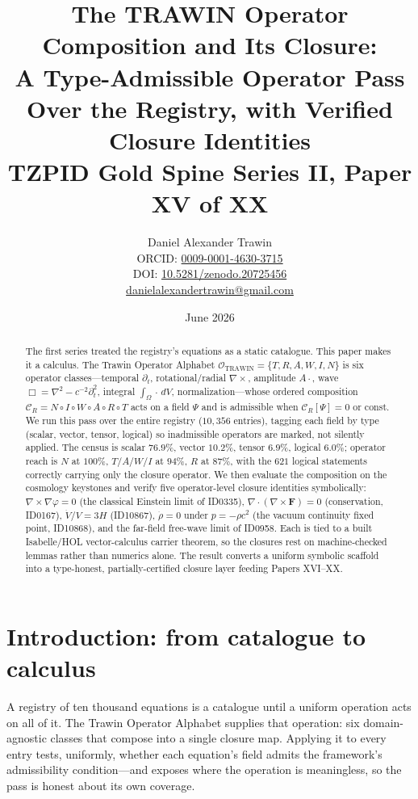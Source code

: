 \documentclass[11pt]{article}
\title{The TRAWIN Operator Composition and Its Closure:\\ A Type-Admissible Operator Pass Over the Registry, with Verified Closure Identities\\[0.6em]
\large TZPID Gold Spine Series II, Paper XV of XX}
\author{Daniel Alexander Trawin\\
\small ORCID: \href{https://orcid.org/0009-0001-4630-3715}{0009-0001-4630-3715}\\
\small DOI: \href{https://doi.org/10.5281/zenodo.20725456}{10.5281/zenodo.20725456}\\
\small \href{mailto:danielalexandertrawin@gmail.com}{danielalexandertrawin@gmail.com}}
\date{June 2026}
\theoremstyle{remark}
\begin{document}
\maketitle
\begin{abstract}
The first series treated the registry's equations as a static catalogue. This paper makes it a calculus. The Trawin Operator Alphabet $\mathcal{O}_{\mathrm{TRAWIN}} = \{T,R,A,W,I,N\}$ is six operator classes---temporal $\partial_t$, rotational/radial $\nabla\times$, amplitude $A\cdot$, wave $\Box = \nabla^2 - c^{-2}\partial_t^2$, integral $\int_\Omega\cdot\,dV$, normalization---whose ordered composition $\mathcal{C}_R = N \circ I \circ W \circ A \circ R \circ T$ acts on a field $\Psi$ and is admissible when $\mathcal{C}_R[\Psi] = 0$ or const. We run this pass over the entire registry ($10{,}356$ entries), tagging each field by type (scalar, vector, tensor, logical) so inadmissible operators are marked, not silently applied. The census is scalar $76.9\%$, vector $10.2\%$, tensor $6.9\%$, logical $6.0\%$; operator reach is $N$ at $100\%$, $T/A/W/I$ at $94\%$, $R$ at $87\%$, with the $621$ logical statements correctly carrying only the closure operator. We then evaluate the composition on the cosmology keystones and verify five operator-level closure identities symbolically: $\nabla\times\nabla\varphi = 0$ (the classical Einstein limit of ID0335), $\nabla\cdot(\nabla\times\mathbf{F}) = 0$ (conservation, ID0167), $\dot V/V = 3H$ (ID10867), $\dot\rho = 0$ under $p = -\rho c^2$ (the vacuum continuity fixed point, ID10868), and the far-field free-wave limit of ID0958. Each is tied to a built Isabelle/HOL vector-calculus carrier theorem, so the closures rest on machine-checked lemmas rather than numerics alone. The result converts a uniform symbolic scaffold into a type-honest, partially-certified closure layer feeding Papers XVI--XX.
\end{abstract}
\section{Introduction: from catalogue to calculus}
A registry of ten thousand equations is a catalogue until a uniform operation acts on all of it. The Trawin Operator Alphabet supplies that operation: six domain-agnostic classes that compose into a single closure map. Applying it to every entry tests, uniformly, whether each equation's field admits the framework's admissibility condition---and exposes where the operation is meaningless, so the pass is honest about its own coverage.
\end{document}
